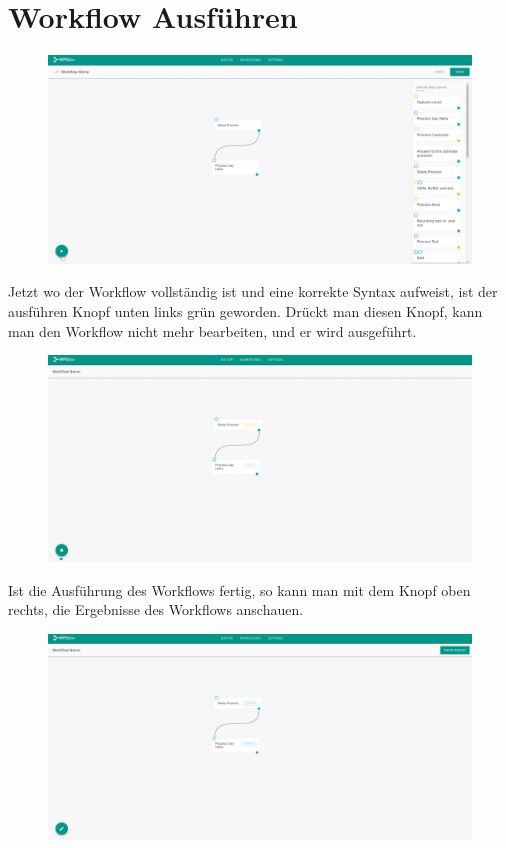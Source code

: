 \chapter{Workflow Ausführen}
    \begin{figure}[H]
        \centering
        \includegraphics[width=15.5cm]{images/Start Workflow.png}
        \label{start_workflow}
    \end{figure}
    Jetzt wo der Workflow vollständig ist und eine korrekte Syntax aufweist, ist der ausführen Knopf unten links grün geworden. Drückt man diesen Knopf, kann man den Workflow nicht mehr bearbeiten, und er wird ausgeführt. 
    \begin{figure}[H]
        \centering
        \includegraphics[width=15.5cm]{images/Running Workflow.png}
        \label{running_workflow}
    \end{figure}
    \noindent Ist die Ausführung des Workflows fertig, so kann man mit dem Knopf oben rechts, die Ergebnisse des Workflows anschauen. 
    \begin{figure}[H]
        \centering
        \includegraphics[width=15.5cm]{images/Finished Workflow.png}
        \label{finished_workflow}
    \end{figure}
